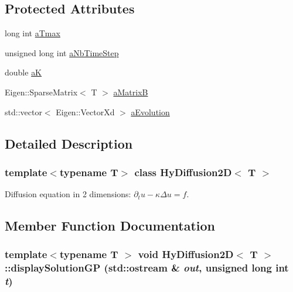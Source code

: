 \subsection*{Protected Attributes}
\begin{DoxyCompactItemize}
\item 
long int \hyperlink{classHyDiffusion2D_a484433cb70b279d460ae7ad99c692b44}{aTmax}
\item 
unsigned long int \hyperlink{classHyDiffusion2D_a3fdb9b91352535d51ab737c8e2bbb096}{aNbTimeStep}
\item 
double \hyperlink{classHyDiffusion2D_adb712ad9fbd8ff8ba019bd0a5c80edb4}{aK}
\item 
Eigen::SparseMatrix$<$ T $>$ \hyperlink{classHyDiffusion2D_a3826559f9dade45395fc0bb046fbab9c}{aMatrixB}
\item 
std::vector$<$ Eigen::VectorXd $>$ \hyperlink{classHyDiffusion2D_aaba7bf56f39cc0caa9bcf8fa4b2f30f0}{aEvolution}
\end{DoxyCompactItemize}


\subsection{Detailed Description}
\subsubsection*{template$<$typename T$>$ class HyDiffusion2D$<$ T $>$}

Diffusion equation in 2 dimensions: $ \partial_t u - \kappa\Delta u = f $. 

\subsection{Member Function Documentation}
\hypertarget{classHyDiffusion2D_a88da599f17d9a34ee45526cf8beffa54}{
\subsubsection[{displaySolutionGP}]{\setlength{\rightskip}{0pt plus 5cm}template$<$typename T $>$ void {\bf HyDiffusion2D}$<$ T $>$::displaySolutionGP (std::ostream \& {\em out}, \/  unsigned long int {\em t})}}
\label{classHyDiffusion2D_a88da599f17d9a34ee45526cf8beffa54}


